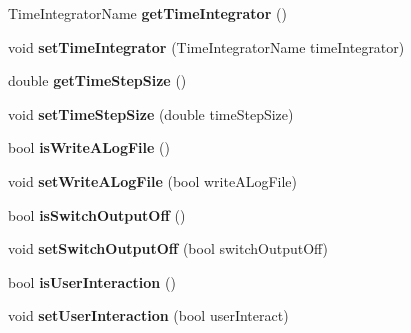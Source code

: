\begin{DoxyCompactItemize}
\item 
\hypertarget{classnatrium_1_1SolverConfiguration_ac7e6189aaa1b54016993e852999376eb}{Time\-Integrator\-Name {\bfseries get\-Time\-Integrator} ()}\label{classnatrium_1_1SolverConfiguration_ac7e6189aaa1b54016993e852999376eb}

\item 
\hypertarget{classnatrium_1_1SolverConfiguration_ac58399f50e64bc8b0efde5b51e246aeb}{void {\bfseries set\-Time\-Integrator} (Time\-Integrator\-Name time\-Integrator)}\label{classnatrium_1_1SolverConfiguration_ac58399f50e64bc8b0efde5b51e246aeb}

\item 
\hypertarget{classnatrium_1_1SolverConfiguration_ae446f5d60a09f30a43258a5ec2bebbbf}{double {\bfseries get\-Time\-Step\-Size} ()}\label{classnatrium_1_1SolverConfiguration_ae446f5d60a09f30a43258a5ec2bebbbf}

\item 
\hypertarget{classnatrium_1_1SolverConfiguration_aab0d1b737708c92e83ebe3424b3bed4d}{void {\bfseries set\-Time\-Step\-Size} (double time\-Step\-Size)}\label{classnatrium_1_1SolverConfiguration_aab0d1b737708c92e83ebe3424b3bed4d}

\item 
\hypertarget{classnatrium_1_1SolverConfiguration_ac97dc43684f8a690de0f3e9c132dda02}{bool {\bfseries is\-Write\-A\-Log\-File} ()}\label{classnatrium_1_1SolverConfiguration_ac97dc43684f8a690de0f3e9c132dda02}

\item 
\hypertarget{classnatrium_1_1SolverConfiguration_a6e50f8fc372b4346ba9f309d5d5f47b3}{void {\bfseries set\-Write\-A\-Log\-File} (bool write\-A\-Log\-File)}\label{classnatrium_1_1SolverConfiguration_a6e50f8fc372b4346ba9f309d5d5f47b3}

\item 
\hypertarget{classnatrium_1_1SolverConfiguration_ae4852378b026ccc913732eb8b20eca74}{bool {\bfseries is\-Switch\-Output\-Off} ()}\label{classnatrium_1_1SolverConfiguration_ae4852378b026ccc913732eb8b20eca74}

\item 
\hypertarget{classnatrium_1_1SolverConfiguration_afcae7f43456c2a127c242b230ea3a8a2}{void {\bfseries set\-Switch\-Output\-Off} (bool switch\-Output\-Off)}\label{classnatrium_1_1SolverConfiguration_afcae7f43456c2a127c242b230ea3a8a2}

\item 
\hypertarget{classnatrium_1_1SolverConfiguration_a6e41f8ce5da4ecafe2e4326997e79f3d}{bool {\bfseries is\-User\-Interaction} ()}\label{classnatrium_1_1SolverConfiguration_a6e41f8ce5da4ecafe2e4326997e79f3d}

\item 
\hypertarget{classnatrium_1_1SolverConfiguration_ad013b9240ee7ae0d5cc43ff5f588c3f3}{void {\bfseries set\-User\-Interaction} (bool user\-Interact)}\label{classnatrium_1_1SolverConfiguration_ad013b9240ee7ae0d5cc43ff5f588c3f3}

\end{DoxyCompactItemize}


